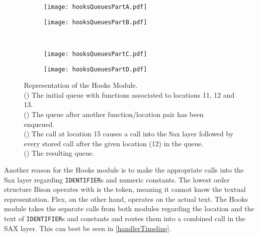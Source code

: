 \documentclass[12pt]{report}
\begin{document}
\begin{figure}
\begin{center}
\begin{subfigure}[t]{.4\linewidth}
	\caption{}
	\label{hooksQueuesA}
	\texttt{[image: hooksQueuesPartA.pdf]}
\end{subfigure}
\begin{subfigure}[t]{.4\linewidth}
	\caption{}
	\label{hooksQueuesB}
	\texttt{[image: hooksQueuesPartB.pdf]}
\end{subfigure} \\
\vspace{4mm}
\begin{subfigure}[t]{.4\linewidth}
	\caption{}
	\label{hooksQueuesC}
	\texttt{[image: hooksQueuesPartC.pdf]}
\end{subfigure}
\begin{subfigure}[t]{.4\linewidth}
	\caption{}
	\label{hooksQueuesD}
	\texttt{[image: hooksQueuesPartD.pdf]}
\end{subfigure}
\end{center}
\caption[Representation of the Hooks Module]{Representation of the Hooks Module. \\() The initial queue with functions associated to locations 11, 12 and 13. \\() The queue after another function\slash location pair has been enqueued. \\ () The call at location 15 causes a call into the Sax layer followed by every stored call after the given location (12) in the queue. \\ () The resulting queue.}
\label{hooksQueues}
\end{figure}

Another reason for the Hooks module is to make the appropriate calls into the Sax layer regarding 
\lstinline{IDENTIFIER}s and numeric constants. The lowest order structure Bison operates with is the 
token, meaning it cannot know the textual representation. Flex, on the other hand, operates on the actual 
text. The Hooks module takes the separate calls from both modules regarding the location and the text of 
\lstinline{IDENTIFIER}s and constants and routes them into a combined call in the SAX layer. This can 
best be seen in \autoref{handlerTimeline}.
\end{document}
